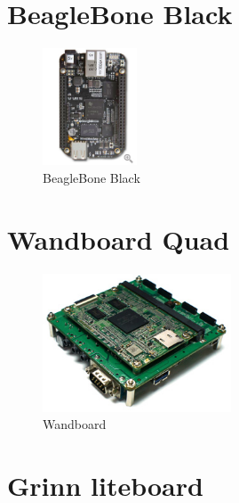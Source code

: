\documentclass[printmode]{mgr}
\begin{document}
\section{BeagleBone Black}

\begin{figure}[htbp]
  \centering
    \includegraphics[width=0.25\textwidth]{beaglebone-front.jpg}
  \caption{BeagleBone Black}
  \label{fig:devboard-beaglebone}
\end{figure}

\section{Wandboard Quad}

\begin{figure}[htbp]
  \centering
    \includegraphics[width=0.5\textwidth]{wandboard-front.jpg}
  \caption{Wandboard}
  \label{fig:devboard-wandboard}
\end{figure}

\section{Grinn liteboard}
\end{document}
